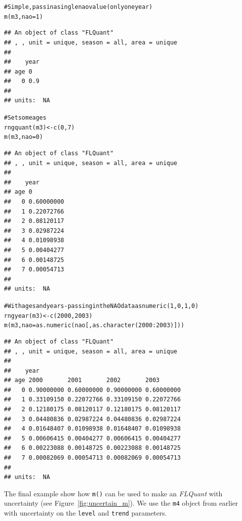 \documentclass[a4paper,english,10pt]{article}\usepackage[]{graphicx}\usepackage[]{color}
\makeatletter
\newcommand{\hlnum}[1]{\textcolor[rgb]{0.2,0.2,0.2}{#1}}%
\newcommand{\hlcom}[1]{\textcolor[rgb]{0.2,0.267,0.4}{#1}}%
\newcommand{\hlopt}[1]{\textcolor[rgb]{0.2,0.2,0.2}{#1}}%
\newcommand{\hlstd}[1]{\textcolor[rgb]{0,0,0}{#1}}%
\newcommand{\hlkwb}[1]{\textcolor[rgb]{0.361,0.506,0.596}{#1}}%
\newcommand{\hlkwc}[1]{\textcolor[rgb]{0.361,0.506,0.596}{#1}}%
\newcommand{\hlkwd}[1]{\textcolor[rgb]{0.361,0.506,0.596}{#1}}%
\newenvironment{kframe}{%
 \def\at@end@of@kframe{}%
 \ifinner\ifhmode%
  \def\at@end@of@kframe{\end{minipage}}%
  \begin{minipage}{\columnwidth}%
 \fi\fi%
 \def\FrameCommand##1{\hskip\@totalleftmargin \hskip-\fboxsep
 \colorbox{shadecolor}{##1}\hskip-\fboxsep
     \hskip-\linewidth \hskip-\@totalleftmargin \hskip\columnwidth}%
 \MakeFramed {\advance\hsize-\width
   \@totalleftmargin\z@ \linewidth\hsize
   \@setminipage}}%
 {\par\unskip\endMakeFramed%
 \at@end@of@kframe}
\newenvironment{knitrout}{}{} %
\newcommand{\code}[1]{{\texttt{#1}}}
\newcommand{\class}[1]{{\textit{#1}}}
\makeatother
\begin{document}
\begin{knitrout}
\color{fgcolor}\begin{kframe}
\begin{alltt}
\hlcom{# Simple, pass in a single nao value (only one year)}
\hlkwd{m}\hlstd{(m3,} \hlkwc{nao}\hlstd{=}\hlnum{1}\hlstd{)}
\end{alltt}
\begin{verbatim}
## An object of class "FLQuant"
## , , unit = unique, season = all, area = unique
## 
##    year
## age 0  
##   0 0.9
## 
## units:  NA
\end{verbatim}
\begin{alltt}
\hlcom{# Set some ages}
\hlkwd{rngquant}\hlstd{(m3)} \hlkwb{<-} \hlkwd{c}\hlstd{(}\hlnum{0}\hlstd{,}\hlnum{7}\hlstd{)}
\hlkwd{m}\hlstd{(m3,} \hlkwc{nao}\hlstd{=}\hlnum{0}\hlstd{)}
\end{alltt}
\begin{verbatim}
## An object of class "FLQuant"
## , , unit = unique, season = all, area = unique
## 
##    year
## age 0         
##   0 0.60000000
##   1 0.22072766
##   2 0.08120117
##   3 0.02987224
##   4 0.01098938
##   5 0.00404277
##   6 0.00148725
##   7 0.00054713
## 
## units:  NA
\end{verbatim}
\begin{alltt}
\hlcom{# With ages and years - passing in the NAO data as numeric (1,0,1,0)}
\hlkwd{rngyear}\hlstd{(m3)} \hlkwb{<-} \hlkwd{c}\hlstd{(}\hlnum{2000}\hlstd{,} \hlnum{2003}\hlstd{)}
\hlkwd{m}\hlstd{(m3,} \hlkwc{nao}\hlstd{=}\hlkwd{as.numeric}\hlstd{(nao[,}\hlkwd{as.character}\hlstd{(}\hlnum{2000}\hlopt{:}\hlnum{2003}\hlstd{)]))}
\end{alltt}
\begin{verbatim}
## An object of class "FLQuant"
## , , unit = unique, season = all, area = unique
## 
##    year
## age 2000       2001       2002       2003      
##   0 0.90000000 0.60000000 0.90000000 0.60000000
##   1 0.33109150 0.22072766 0.33109150 0.22072766
##   2 0.12180175 0.08120117 0.12180175 0.08120117
##   3 0.04480836 0.02987224 0.04480836 0.02987224
##   4 0.01648407 0.01098938 0.01648407 0.01098938
##   5 0.00606415 0.00404277 0.00606415 0.00404277
##   6 0.00223088 0.00148725 0.00223088 0.00148725
##   7 0.00082069 0.00054713 0.00082069 0.00054713
## 
## units:  NA
\end{verbatim}
\end{kframe}
\end{knitrout}

The final example show how \code{m()} can be used to make an \class{FLQuant} with uncertainty (see Figure~\ref{fig:uncertain_m}). We use the \code{m4} object from earlier with uncertainty on the \code{level} and \code{trend} parameters.
\end{document}
